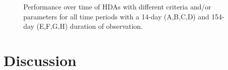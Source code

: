\documentclass[a4paper]{article}
\begin{document}
\begin{figure}[htpb!]
\centering
\caption{Performance over time of HDAs with different criteria and/or parameters for all time periods with a 14-day (A,B,C,D) and 154-day (E,F,G,H) duration of observation.}
\label{fig:criteria_sensitivity}
\end{figure}



\section{Discussion}  
\end{document}

